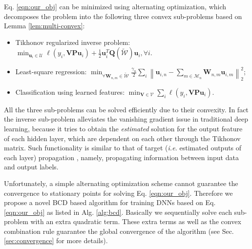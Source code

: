 \documentclass{article}
\def\ie{\emph{i.e. }}
\begin{document}
			
	
    Eq. \ref{eqn:our_obj} can be minimized using alternating optimization, which decomposes the problem into the following three convex sub-problems based on Lemma \ref{lem:multi-convex}:

        \begin{itemize}
    \item Tikhonov regularized inverse problem: $\min_{\mathbf{u}_i\in\mathcal{U}} \ell(y_i, \mathbf{V}\mathbf{P}\mathbf{u}_{i}) + \frac{1}{2}\mathbf{u}_i^T\mathbf{Q}(\tilde{\mathcal{W}})\mathbf{u}_i, \forall i.$
    \item Least-square regression: $\min_{\forall\mathbf{W}_{n,m}\in\tilde{\mathcal{W}}} \frac{\gamma_n}{2}\sum_{i}\left\|\mathbf{u}_{i,n} - \sum_{m\in\mathcal{M}_n}\mathbf{W}_{n,m}\mathbf{u}_{i,m}\right\|_2^2$;
    \item Classification using learned features: $\min_{\mathbf{V}\in\mathcal{V}} \sum_i \ell(y_i, \mathbf{V}\mathbf{P}\mathbf{u}_{i})$.
    \end{itemize}
        All the three sub-problems can be solved efficiently due to their convexity. In fact the inverse sub-problem alleviates the vanishing gradient issue in traditional deep learning, because it tries to obtain the {\em estimated} solution for the output feature of each hidden layer, which are dependent on each other through the Tikhonov matrix. Such functionality is similar to that of target (\ie estimated outputs of each layer) propagation \cite{bengio2014auto}, namely, propagating information between input data and output labels.
        
        Unfortunately, a simple alternating optimization scheme cannot guarantee the convergence to stationary points for solving Eq. \ref{eqn:our_obj}.  Therefore we propose a novel BCD based algorithm for training DNNs based on Eq. \ref{eqn:our_obj} as listed in Alg. \ref{alg:bcd}. Basically we sequentially solve each sub-problem with an extra quadratic term. These extra terms as well as the convex combination rule guarantee the global convergence of the algorithm (see Sec. \ref{sec:convergence} for more details). 
\end{document}

